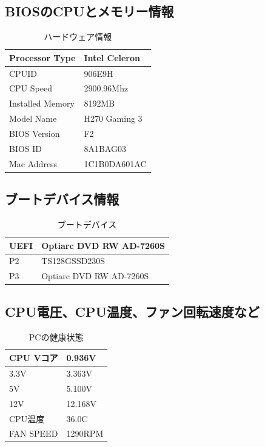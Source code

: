 \documentclass[10pt]{article}
\begin{document}
\subsection{BIOSのCPUとメモリー情報}
\begingroup
\setlength{\tabcolsep}{10pt} %
\renewcommand{\arraystretch}{1.5} %
\begin{table}[H]
	\caption{ハードウェア情報}
	\centering
	\begin{tabular}{|l|l|}
		\hline
		Processor Type & Intel Celeron \\ \hline
		CPUID & 906E9H \\ \hline
		CPU Speed & 2900.96Mhz \\ \hline
		Installed Memory & 8192MB \\ \hline
		Model Name & H270 Gaming 3 \\ \hline
		BIOS Version & F2 \\ \hline
		BIOS ID & 8A1BAG03 \\ \hline
		Mac Address & 1C1B0DA601AC \\ \hline
	\end{tabular}
\end{table}
\endgroup


\subsection{ブートデバイス情報}
\begingroup
\setlength{\tabcolsep}{10pt} %
\renewcommand{\arraystretch}{1.5} %
\begin{table}[H]
	\caption{ブートデバイス}
	\centering
	\begin{tabular}{|l|l|}
		\hline
		UEFI & Optiarc DVD RW AD-7260S \\ \hline
		P2   & TS128GSSD230S           \\ \hline
		P3   & Optiarc DVD RW AD-7260S \\ \hline
	\end{tabular}
\end{table}
\endgroup


\subsection{CPU電圧、CPU温度、ファン回転速度など}
\begingroup
\setlength{\tabcolsep}{10pt} %
\renewcommand{\arraystretch}{1.5} %
\begin{table}[H]
	\caption{PCの健康状態}
	\centering
	\begin{tabular}{|l|l|}
		\hline
		CPU Vコア & 0.936V \\ \hline
		3.3V   & 3.363V           \\ \hline
		5V   & 5.100V \\ \hline
		12V   & 12.168V \\ \hline
		CPU温度   & 36.0\textdegree{}C \\ \hline
		FAN SPEED  & 1290RPM \\ \hline
	\end{tabular}
\end{table}
\endgroup
\pagebreak
\end{document}

